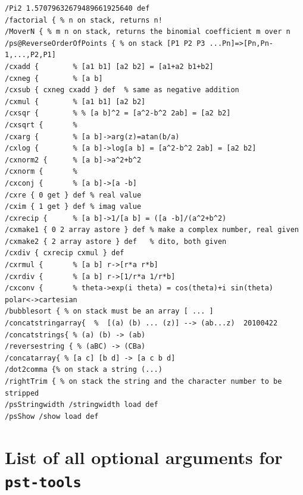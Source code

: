 \documentclass[fontsize=11pt,english,BCOR=10mm,DIV=12,bibliography=totoc,parskip=false,headings=small,
    headinclude=false,footinclude=false,oneside]{pst-doc}
\begin{document}
\footnotesize
\begin{verbatim}
/Pi2 1.57079632679489661925640 def
/factorial { % n on stack, returns n! 
/MoverN { % m n on stack, returns the binomial coefficient m over n
/ps@ReverseOrderOfPoints { % on stack [P1 P2 P3 ...Pn]=>[Pn,Pn-1,...,P2,P1]
/cxadd {		% [a1 b1] [a2 b2] = [a1+a2 b1+b2]
/cxneg {		% [a b]
/cxsub { cxneg cxadd } def  % same as negative addition
/cxmul {		% [a1 b1] [a2 b2]
/cxsqr {		% % [a b]^2 = [a^2-b^2 2ab] = [a2 b2]
/cxsqrt {		% 
/cxarg { 		% [a b]->arg(z)=atan(b/a)
/cxlog {		% [a b]->log[a b] = [a^2-b^2 2ab] = [a2 b2]
/cxnorm2 {		% [a b]->a^2+b^2
/cxnorm {		% 
/cxconj {		% [a b]->[a -b]
/cxre { 0 get } def	% real value
/cxim { 1 get } def	% imag value
/cxrecip {		% [a b]->1/[a b] = ([a -b]/(a^2+b^2)
/cxmake1 { 0 2 array astore } def % make a complex number, real given
/cxmake2 { 2 array astore } def	  % dito, both given
/cxdiv { cxrecip cxmul } def
/cxrmul {		% [a b] r->[r*a r*b]
/cxrdiv {		% [a b] r->[1/r*a 1/r*b]
/cxconv {		% theta->exp(i theta) = cos(theta)+i sin(theta) polar<->cartesian
/bubblesort { % on stack must be an array [ ... ]
/concatstringarray{  %  [(a) (b) ... (z)] --> (ab...z)  20100422
/concatstrings{ % (a) (b) -> (ab)  
/reversestring { % (aBC) -> (CBa)
/concatarray{ % [a c] [b d] -> [a c b d]  
/dot2comma {% on stack a string (...) 
/rightTrim { % on stack the string and the character number to be stripped  
/psStringwidth /stringwidth load def
/psShow /show load def
\end{verbatim}

\normalsize

\clearpage
\section{List of all optional arguments for \texttt{pst-tools}}





\bgroup
\raggedright
\nocite{*}
%
\printbibliography
\egroup

\printindex
\end{document}
